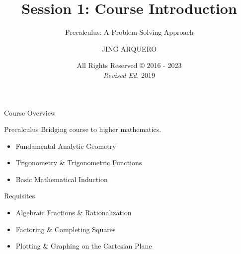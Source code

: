\documentclass[14pt, aspectratio=169]{beamer}
\begin{document}
\title{Session 1: Course Introduction}
\subtitle{Precalculus: A Problem-Solving Approach}
\author{JING ARQUERO}
\date{All Rights Reserved {\textrm \copyright} 2016 - 2023 \\ \textit{Revised Ed.} 2019}

\begin{frame}
 \maketitle
\end{frame}

\begin{frame}{Course Overview}
    \begin{block}{Precalculus}
    Bridging course to higher mathematics.
    \begin{itemize}
            \item Fundamental Analytic Geometry
            \item Trigonometry \& Trigonometric Functions
            \item Basic Mathematical Induction
        \end{itemize}
    \end{block}

    Requisites
    \begin{itemize}
     \item Algebraic Fractions \& Rationalization
     \item Factoring \& Completing Squares
     \item Plotting \& Graphing on the Cartesian Plane
    \end{itemize}

\end{frame}
\end{document}
